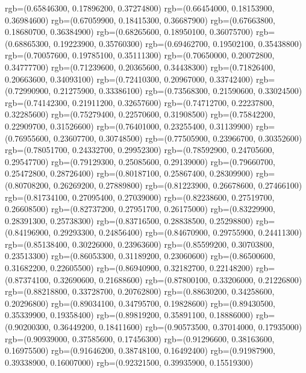 {{        rgb=(0.65846300, 0.17896200, 0.37274800)
        rgb=(0.66454000, 0.18153900, 0.36984600)
        rgb=(0.67059900, 0.18415300, 0.36687900)
        rgb=(0.67663800, 0.18680700, 0.36384900)
        rgb=(0.68265600, 0.18950100, 0.36075700)
        rgb=(0.68865300, 0.19223900, 0.35760300)
        rgb=(0.69462700, 0.19502100, 0.35438800)
        rgb=(0.70057600, 0.19785100, 0.35111300)
        rgb=(0.70650000, 0.20072800, 0.34777700)
        rgb=(0.71239600, 0.20365600, 0.34438300)
        rgb=(0.71826400, 0.20663600, 0.34093100)
        rgb=(0.72410300, 0.20967000, 0.33742400)
        rgb=(0.72990900, 0.21275900, 0.33386100)
        rgb=(0.73568300, 0.21590600, 0.33024500)
        rgb=(0.74142300, 0.21911200, 0.32657600)
        rgb=(0.74712700, 0.22237800, 0.32285600)
        rgb=(0.75279400, 0.22570600, 0.31908500)
        rgb=(0.75842200, 0.22909700, 0.31526600)
        rgb=(0.76401000, 0.23255400, 0.31139900)
        rgb=(0.76955600, 0.23607700, 0.30748500)
        rgb=(0.77505900, 0.23966700, 0.30352600)
        rgb=(0.78051700, 0.24332700, 0.29952300)
        rgb=(0.78592900, 0.24705600, 0.29547700)
        rgb=(0.79129300, 0.25085600, 0.29139000)
        rgb=(0.79660700, 0.25472800, 0.28726400)
        rgb=(0.80187100, 0.25867400, 0.28309900)
        rgb=(0.80708200, 0.26269200, 0.27889800)
        rgb=(0.81223900, 0.26678600, 0.27466100)
        rgb=(0.81734100, 0.27095400, 0.27039000)
        rgb=(0.82238600, 0.27519700, 0.26608500)
        rgb=(0.82737200, 0.27951700, 0.26175000)
        rgb=(0.83229900, 0.28391300, 0.25738300)
        rgb=(0.83716500, 0.28838500, 0.25298800)
        rgb=(0.84196900, 0.29293300, 0.24856400)
        rgb=(0.84670900, 0.29755900, 0.24411300)
        rgb=(0.85138400, 0.30226000, 0.23963600)
        rgb=(0.85599200, 0.30703800, 0.23513300)
        rgb=(0.86053300, 0.31189200, 0.23060600)
        rgb=(0.86500600, 0.31682200, 0.22605500)
        rgb=(0.86940900, 0.32182700, 0.22148200)
        rgb=(0.87374100, 0.32690600, 0.21688600)
        rgb=(0.87800100, 0.33206000, 0.21226800)
        rgb=(0.88218800, 0.33728700, 0.20762800)
        rgb=(0.88630200, 0.34258600, 0.20296800)
        rgb=(0.89034100, 0.34795700, 0.19828600)
        rgb=(0.89430500, 0.35339900, 0.19358400)
        rgb=(0.89819200, 0.35891100, 0.18886000)
        rgb=(0.90200300, 0.36449200, 0.18411600)
        rgb=(0.90573500, 0.37014000, 0.17935000)
        rgb=(0.90939000, 0.37585600, 0.17456300)
        rgb=(0.91296600, 0.38163600, 0.16975500)
        rgb=(0.91646200, 0.38748100, 0.16492400)
        rgb=(0.91987900, 0.39338900, 0.16007000)
        rgb=(0.92321500, 0.39935900, 0.15519300)
}}
